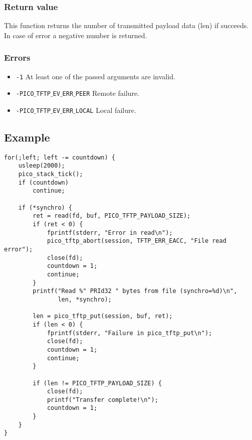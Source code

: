 \subsubsection*{Return value}
This function returns the number of transmitted payload data (len) if succeeds. In case of error a negative number is returned.

\subsubsection*{Errors}
\begin{itemize}[noitemsep]
\item \texttt{-1} At least one of the passed arguments are invalid.
\item \texttt{-PICO$\_$TFTP$\_$EV$\_$ERR$\_$PEER} Remote failure.
\item \texttt{-PICO$\_$TFTP$\_$EV$\_$ERR$\_$LOCAL} Local failure.
\end{itemize}

\subsection*{Example}
\begin{verbatim}
for(;left; left -= countdown) {
    usleep(2000);
    pico_stack_tick();
    if (countdown)
        continue;

    if (*synchro) {
        ret = read(fd, buf, PICO_TFTP_PAYLOAD_SIZE);
        if (ret < 0) {
            fprintf(stderr, "Error in read\n");
            pico_tftp_abort(session, TFTP_ERR_EACC, "File read error");
            close(fd);
            countdown = 1;
            continue;
        }
        printf("Read %" PRId32 " bytes from file (synchro=%d)\n",
               len, *synchro);

        len = pico_tftp_put(session, buf, ret);
        if (len < 0) {
            fprintf(stderr, "Failure in pico_tftp_put\n");
            close(fd);
            countdown = 1;
            continue;
        }

        if (len != PICO_TFTP_PAYLOAD_SIZE) {
            close(fd);
            printf("Transfer complete!\n");
            countdown = 1;
        }
    }
}
\end{verbatim}
